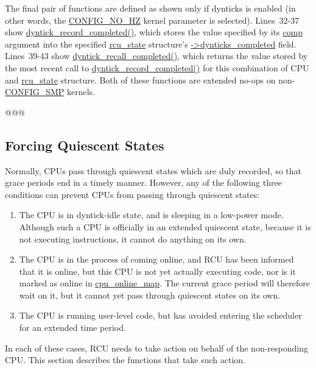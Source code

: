 
The final pair of functions are defined as shown only if dynticks
is enabled (in other words, the \url{CONFIG_NO_HZ} kernel parameter
is selected).
Lines~32-37 show \url{dyntick_record_completed()}, which stores the
value specified by its \url{comp} argument into the specified
\url{rcu_state} structure's \url{->dynticks_completed} field.
Lines~39-43 show \url{dyntick_recall_completed()}, which returns
the value stored by the most recent call to
\url{dyntick_record_completed()} for this combination of CPU and
\url{rcu_state} structure.
Both of these functions are extended no-ops on non-\url{CONFIG_SMP}
kernels.

@@@

\subsection{Forcing Quiescent States}
\label{app:rcuimpl:rcutreewt:Forcing Quiescent States}

Normally, CPUs pass through quiescent states which are duly recorded,
so that grace periods end in a timely manner.
However, any of the following three conditions can prevent CPUs from
passing through quiescent states:

\begin{enumerate}
\item	The CPU is in dyntick-idle state, and is sleeping in a low-power
	mode.
	Although such a CPU is officially in an extended quiescent state,
	because it is not executing instructions, it cannot do anything
	on its own.
\item	The CPU is in the process of coming online, and RCU has been
	informed that it is online, but this CPU is not yet actually
	executing code, nor is it marked as online in \url{cpu_online_map}.
	The current grace period will therefore wait on it, but it cannot
	yet pass through quiescent states on its own.
\item	The CPU is running user-level code, but has avoided
	entering the scheduler for an extended time period.
\end{enumerate}

In each of these cases, RCU needs to take action on behalf of the
non-responding CPU.
This section describes the functions that take such action.

